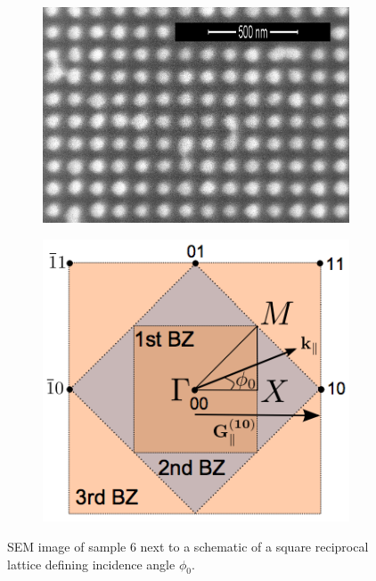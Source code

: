 \begin{figure}
    \begin{subfigure}{0.5\textwidth}
        \flushright
        \includegraphics[width=0.5\linewidth]{figures/Ch3/S6_SEM(1).png} %
    \end{subfigure}
    \begin{subfigure}{0.5\textwidth}
        \flushleft
        \includegraphics[width=0.4\linewidth]{figures/Ch2/ReciprocalLattice.png}    %
    \end{subfigure}
    \caption{SEM image of sample 6 next to a schematic of a square reciprocal lattice defining incidence angle $\phi_0$.}
    \label{fig:S6_reciprocallattice_schematic}
\end{figure}

